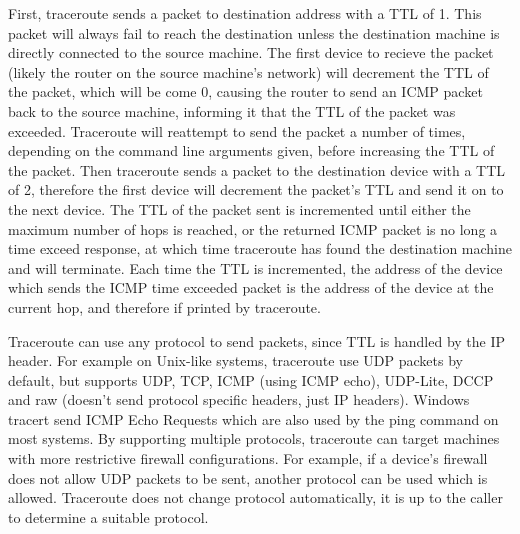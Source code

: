 \documentclass[10pt,a4paper]{article}
\begin{document}
    First, traceroute sends a packet to destination address with a TTL of 1.
    This packet will always fail to reach the destination unless the destination machine is directly connected to the
    source machine.
    The first device to recieve the packet (likely the router on the source machine's network) will decrement the TTL of
    the packet, which will be come 0, causing the router to send an ICMP packet back to the source machine, informing it
    that the TTL of the packet was exceeded.
    Traceroute will reattempt to send the packet a number of times, depending on the command line arguments given, before
    increasing the TTL of the packet.
    Then traceroute sends a packet to the destination device with a TTL of 2, therefore the first device will decrement
    the packet's TTL and send it on to the next device.
    The TTL of the packet sent is incremented until either the maximum number of hops is reached, or the returned ICMP
    packet is no long a time exceed response, at which time traceroute has found the destination machine and
    will terminate.
    Each time the TTL is incremented, the address of the device which sends the ICMP time exceeded packet is the address
    of the device at the current hop, and therefore if printed by traceroute.

    Traceroute can use any protocol to send packets, since TTL is handled by the IP header.
    For example on Unix-like systems, traceroute use UDP packets by default, but supports UDP, TCP, ICMP (using ICMP
    echo), UDP-Lite, DCCP and raw (doesn't send protocol specific headers, just IP headers).
    Windows tracert send ICMP Echo Requests which are also used by the ping command on most systems.
    By supporting multiple protocols, traceroute can target machines with more restrictive firewall configurations.
    For example, if a device's firewall does not allow UDP packets to be sent, another protocol can be used which is
    allowed.
    Traceroute does not change protocol automatically, it is up to the caller to determine a suitable protocol.
\end{document}
